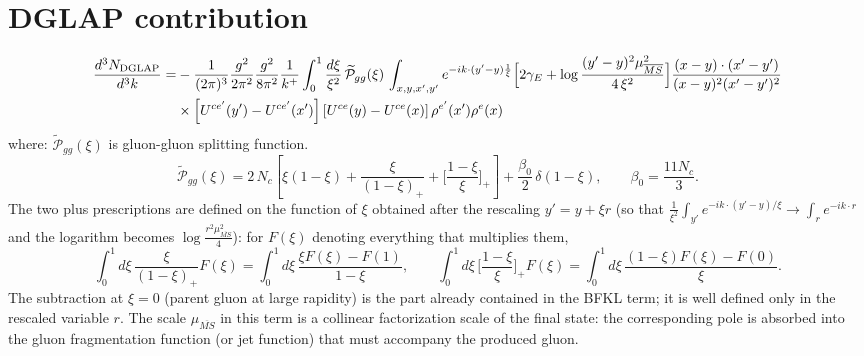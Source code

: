 \documentclass[9pt]{article}
\numberwithin{equation}{section}
\begin{document}
\section{DGLAP contribution}
\begin{align}
\frac{d^{3}N_{\rm DGLAP}}{d^{3}k}= &-\frac{1}{(2\pi)^{3}}\frac{g^{2}}{2\pi^{2}}\frac{g^{2}}{8\pi^{2}}\frac{1}{k^{+}}\int_{0}^{1}\frac{d\xi}{\xi^{2}}\,\widetilde{\mathcal P}_{gg}(\xi)\,\int_{x,y,x',y'}e^{-ik\cdot(y'-y)\frac{1}{\xi}}\Big[2\gamma_{E}+\log\frac{(y'-y)^{2}\mu^{2}_{\overline{MS}}}{4\,\xi^{2}}\Big]\frac{(x-y)\cdot(x'-y')}{(x-y)^{2}(x'-y')^{2}}\notag\\
&\times\left[U^{ce'}(y') - U^{ce'}(x')\right]\left[U^{ce}(y) - U^{ce}(x)\right]\rho^{e'}(x')\rho^{e}(x)
\end{align}
where:
$\widetilde{\mathcal{P}}_{gg}(\xi)$ is gluon-gluon splitting function.
$$\widetilde{\mathcal{P}}_{gg}(\xi) = 2\,N_{c}\left[\xi(1-\xi) + \frac{\xi}{(1-\xi)_{+}} + \Big[\frac{1-\xi}{\xi}\Big]_{+}\right]+\frac{\beta_{0}}{2}\,\delta(1-\xi),\qquad \beta_{0}=\frac{11N_{c}}{3}.$$
The two plus prescriptions are defined on the function of $\xi$ obtained after the rescaling $y'=y+\xi r$ (so that $\frac{1}{\xi^{2}}\int_{y'}e^{-ik\cdot(y'-y)/\xi}\to\int_{r}e^{-ik\cdot r}$ and the logarithm becomes $\log\frac{r^{2}\mu^{2}_{\overline{MS}}}{4}$): for $F(\xi)$ denoting everything that multiplies them,
\begin{equation}
\int_{0}^{1}d\xi\,\frac{\xi}{(1-\xi)_{+}}F(\xi)=\int_{0}^{1}d\xi\,\frac{\xi F(\xi)-F(1)}{1-\xi},\qquad
\int_{0}^{1}d\xi\,\Big[\frac{1-\xi}{\xi}\Big]_{+}F(\xi)=\int_{0}^{1}d\xi\,\frac{(1-\xi)F(\xi)-F(0)}{\xi}.
\end{equation}
The subtraction at $\xi=0$ (parent gluon at large rapidity) is the part already contained in the BFKL term; it is well defined only in the rescaled variable $r$.
The scale $\mu_{\overline{MS}}$ in this term is a collinear factorization scale of the final state: the corresponding pole is absorbed into the gluon fragmentation function (or jet function) that must accompany the produced gluon.
\end{document}
